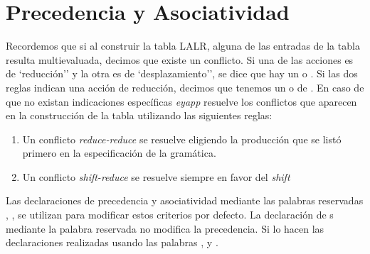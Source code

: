 \section{Precedencia y Asociatividad}
\label{section:prioridades}
Recordemos que si al construir la tabla LALR,
alguna de las entradas de la tabla resulta multievaluada, decimos
que existe un conflicto.
Si una de las acciones es de `reducción'' y la otra es de
`desplazamiento'', se dice que hay un  o
. Si las
dos reglas indican una acción de reducción, decimos que tenemos un 
 o de .
En caso de que no existan indicaciones específicas \emph{eyapp} resuelve
los conflictos que aparecen en la construcción de la tabla utilizando
las siguientes reglas:

\begin{enumerate}
\item
Un conflicto \emph{reduce-reduce} se resuelve eligiendo la producción
que se listó primero en la especificación de la gramática.
\item
Un conflicto \emph{shift-reduce} se resuelve siempre en favor del \emph{shift}
\end{enumerate}

Las declaraciones de precedencia y asociatividad mediante las
palabras reservadas , , 
se utilizan para modificar estos criterios por defecto. 
La declaración de s mediante la palabra
reservada  no modifica la precedencia. Si lo hacen las
declaraciones realizadas usando las palabras , 
y . 

